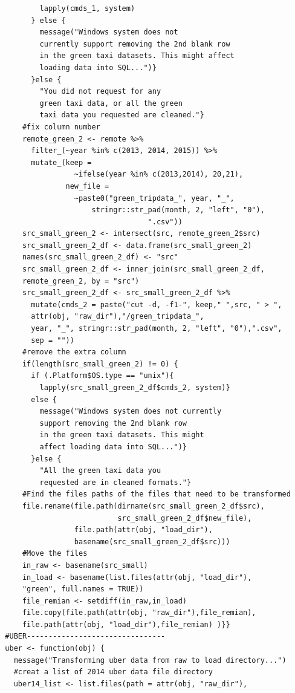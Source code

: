 \documentclass[12pt,twoside]{reedthesis}
\theoremstyle{definition}
\theoremstyle{definition}
\theoremstyle{definition}
\theoremstyle{remark}
\begin{document}
\begin{verbatim}
          lapply(cmds_1, system)
        } else {
          message("Windows system does not 
          currently support removing the 2nd blank row
          in the green taxi datasets. This might affect 
          loading data into SQL...")}
        }else {
          "You did not request for any 
          green taxi data, or all the green
          taxi data you requested are cleaned."}
      #fix column number
      remote_green_2 <- remote %>%
        filter_(~year %in% c(2013, 2014, 2015)) %>%
        mutate_(keep = 
                  ~ifelse(year %in% c(2013,2014), 20,21),
                new_file = 
                  ~paste0("green_tripdata_", year, "_", 
                      stringr::str_pad(month, 2, "left", "0"),
                                   ".csv"))
      src_small_green_2 <- intersect(src, remote_green_2$src)
      src_small_green_2_df <- data.frame(src_small_green_2) 
      names(src_small_green_2_df) <- "src"
      src_small_green_2_df <- inner_join(src_small_green_2_df, 
      remote_green_2, by = "src")
      src_small_green_2_df <- src_small_green_2_df %>%
        mutate(cmds_2 = paste("cut -d, -f1-", keep," ",src, " > ",
        attr(obj, "raw_dir"),"/green_tripdata_", 
        year, "_", stringr::str_pad(month, 2, "left", "0"),".csv", 
        sep = ""))
      #remove the extra column
      if(length(src_small_green_2) != 0) {
        if (.Platform$OS.type == "unix"){
          lapply(src_small_green_2_df$cmds_2, system)} 
        else {
          message("Windows system does not currently 
          support removing the 2nd blank row 
          in the green taxi datasets. This might 
          affect loading data into SQL...")}
        }else {
          "All the green taxi data you
          requested are in cleaned formats."}
      #Find the files paths of the files that need to be transformed
      file.rename(file.path(dirname(src_small_green_2_df$src),
                            src_small_green_2_df$new_file), 
                  file.path(attr(obj, "load_dir"),
                  basename(src_small_green_2_df$src)))
      #Move the files
      in_raw <- basename(src_small)
      in_load <- basename(list.files(attr(obj, "load_dir"), 
      "green", full.names = TRUE))
      file_remian <- setdiff(in_raw,in_load)
      file.copy(file.path(attr(obj, "raw_dir"),file_remian), 
      file.path(attr(obj, "load_dir"),file_remian) )}}
  #UBER--------------------------------
  uber <- function(obj) {
    message("Transforming uber data from raw to load directory...")
    #creat a list of 2014 uber data file directory
    uber14_list <- list.files(path = attr(obj, "raw_dir"), 

\end{verbatim}
\end{document}
